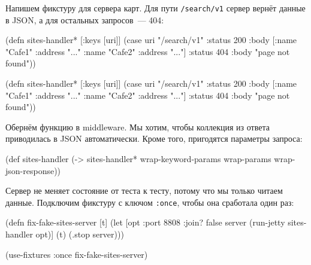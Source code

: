Напишем фикстуру для сервера карт. Для пути \verb|/search/v1| сервер вернёт
данные в JSON, а для остальных запросов~--- 404:

\label{sites-handler}

\ifx\devicetype\mobile

\begin{english}
  \begin{clojure}
(defn sites-handler* [{:keys [uri]}]
  (case uri
    "/search/v1"
    {:status 200
     :body [{:name "Cafe1"
             :address "..."}
            {:name "Cafe2"
             :address "..."}]}
    {:status 404
     :body "page not found"}))
  \end{clojure}
\end{english}

\else

\begin{english}
  \begin{clojure}
(defn sites-handler* [{:keys [uri]}]
  (case uri
    "/search/v1"
    {:status 200 :body [{:name "Cafe1" :address "..."}
                        {:name "Cafe2" :address "..."}]}
    {:status 404 :body "page not found"}))
  \end{clojure}
\end{english}

\fi


Обернём функцию в middleware. Мы хотим, чтобы коллекция из ответа приводилась в
JSON автоматически. Кроме того, пригодятся параметры запроса:

\begin{english}
  \begin{clojure}
(def sites-handler
  (-> sites-handler*
      wrap-keyword-params
      wrap-params
      wrap-json-response))
  \end{clojure}
\end{english}

Сервер не меняет состояние от теста к тесту, потому что мы только читаем
данные. Подключим фикстуру с ключом \verb|:once|, чтобы она сработала один
раз:

\ifx\devicetype\mobile

\begin{english}
  \begin{clojure}
(defn fix-fake-sites-server [t]
  (let [opt {:port 8808 :join? false}
        server (run-jetty
                 sites-handler opt)]
    (t)
    (.stop server)))

(use-fixtures :once
  fix-fake-sites-server)
  \end{clojure}
\end{english}

